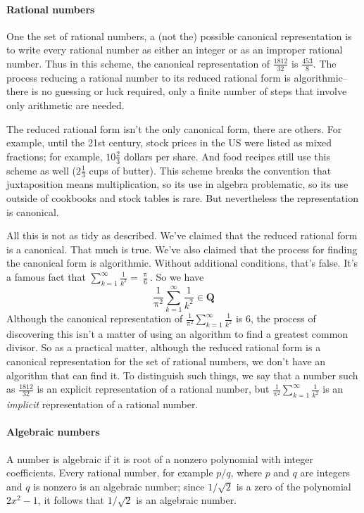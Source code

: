 \documentclass[12pt,fleqn]{article}
\newcommand{\rationals}{\mathbf{Q}}
\begin{document}
\paragraph{Rational numbers} One the set of rational numbers, a (not the) possible canonical representation  is to write every rational number as either an integer or as an improper
rational number.  Thus in this scheme, the canonical representation of $\frac{1812}{32}$ is  $\frac{453}{8}$. The process reducing a rational
number to its reduced rational  form is algorithmic--there is no guessing or luck required, only a finite number of steps that  involve only arithmetic are needed.

The reduced rational form isn't the only canonical form, there are others. For example, until the 21st century, stock prices in the US were listed as mixed fractions; for example, $10 \frac{2}{3}$ dollars per share. And food recipes still use this scheme as well ($2 \frac{1}{3}$ cups of butter). This scheme 
breaks the  convention that juxtaposition means multiplication, so its use in algebra problematic, so its use outside of cookbooks and stock tables is rare. But
nevertheless the representation is canonical.

All this is not as tidy as described. We've claimed that the reduced rational form is a canonical. That much is true. We've also claimed that the 
process for finding the canonical form is algorithmic. Without additional conditions, that's false.  It's a famous fact that 
$\sum_{k=1}^\infty \frac{1}{k^2}  = \frac{\uppi}{6}$. So we have
\begin{equation}
\frac{1}{\uppi^2} \sum_{k=1}^\infty \frac{1}{k^2}  \in \rationals
\end{equation}
Although the canonical representation of $\frac{1}{\uppi^2} \sum_{k=1}^\infty \frac{1}{k^2}  $ is 6, the process of discovering this isn't a matter of 
using an algorithm to find a greatest common divisor.  So as a practical matter, although the reduced rational form is a canonical representation for the
set of rational numbers, we don't have an algorithm that can find it.  To distinguish such things, we say that a number such as $\frac{1812}{32}$  is
an explicit representation of a rational number, but $\frac{1}{\uppi^2} \sum_{k=1}^\infty \frac{1}{k^2}  $ is an \emph{implicit} representation of
a rational number.

\paragraph{Algebraic  numbers} A number is algebraic if it is root of a nonzero polynomial with integer coefficients. Every rational number, for example 
$p/q$, where $p$ and $q$ are integers and $q$ is nonzero is an algebraic number; since $1/\sqrt{2}$ is a zero of the polynomial $2 x^2 - 1$, it
follows that $1/\sqrt{2}$ is an algebraic number.
\end{document}
